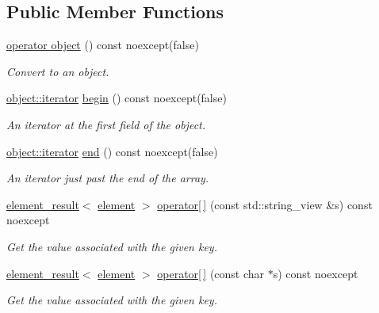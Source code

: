 \subsection*{Public Member Functions}
\begin{DoxyCompactItemize}
\item 
\hyperlink{classsimdjson_1_1document_1_1element__result_3_01document_1_1object_01_4_a1860c0c14ebacd768bde403e0cc446d3}{operator object} () const noexcept(false)
\begin{DoxyCompactList}\small\item\em Convert to an object. \end{DoxyCompactList}\item 
\hyperlink{classsimdjson_1_1document_1_1object_1_1iterator}{object\+::iterator} \hyperlink{classsimdjson_1_1document_1_1element__result_3_01document_1_1object_01_4_a56c21003eac07e4134fd13d0c7c753e5}{begin} () const noexcept(false)
\begin{DoxyCompactList}\small\item\em An iterator at the first field of the object. \end{DoxyCompactList}\item 
\hyperlink{classsimdjson_1_1document_1_1object_1_1iterator}{object\+::iterator} \hyperlink{classsimdjson_1_1document_1_1element__result_3_01document_1_1object_01_4_acec887c649977b2902142b8690e355dc}{end} () const noexcept(false)
\begin{DoxyCompactList}\small\item\em An iterator just past the end of the array. \end{DoxyCompactList}\item 
\hyperlink{classsimdjson_1_1document_1_1element__result}{element\+\_\+result}$<$ \hyperlink{classsimdjson_1_1document_1_1element}{element} $>$ \hyperlink{classsimdjson_1_1document_1_1element__result_3_01document_1_1object_01_4_a02f08a5cb7573c2293cbeddae4080032}{operator\mbox{[}$\,$\mbox{]}} (const std\+::string\+\_\+view \&s) const noexcept
\begin{DoxyCompactList}\small\item\em Get the value associated with the given key. \end{DoxyCompactList}\item 
\hyperlink{classsimdjson_1_1document_1_1element__result}{element\+\_\+result}$<$ \hyperlink{classsimdjson_1_1document_1_1element}{element} $>$ \hyperlink{classsimdjson_1_1document_1_1element__result_3_01document_1_1object_01_4_a659bd57996f58b8c32278f07b7447266}{operator\mbox{[}$\,$\mbox{]}} (const char $\ast$s) const noexcept
\begin{DoxyCompactList}\small\item\em Get the value associated with the given key. \end{DoxyCompactList}\end{DoxyCompactItemize}

